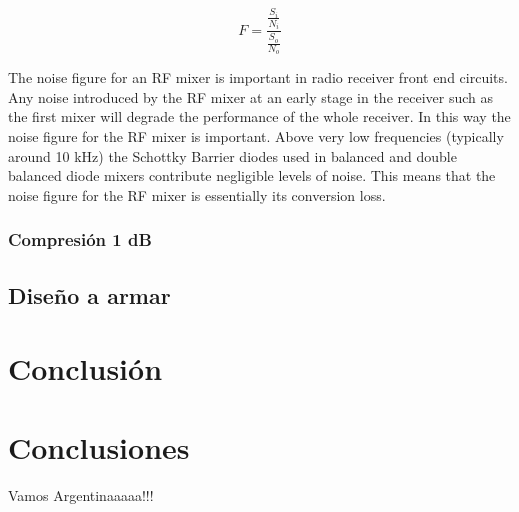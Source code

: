 \documentclass[a4paper,10pt]{article}
\begin{document}
		$$F=\frac{\frac{S_i}{N_i}}{\frac{S_o}{N_o}}$$
		
		The noise figure for an RF mixer is important in radio receiver front end circuits. Any noise introduced by the RF mixer at an early stage in the receiver such as the first mixer will degrade the performance of the whole receiver. In this way the noise figure for the RF mixer is important. Above very low frequencies (typically around 10 kHz) the Schottky Barrier diodes used in balanced and double balanced diode mixers contribute negligible levels of noise. This means that the noise figure for the RF mixer is essentially its conversion loss.
		\subsubsection{Compresión 1 dB}


	\subsection{Diseño a armar}


\newpage
\section{Conclusión}

\newpage
\section{Conclusiones}
	\indent Vamos Argentinaaaaa!!!
\end{document}

